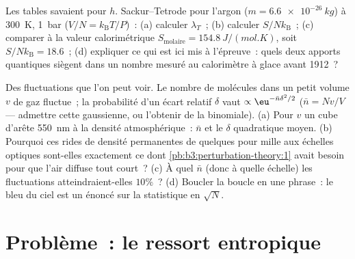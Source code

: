 \begin{exercise}[$\star\star\star$]\label{exo:b3:microcanonical-ensemble:11}
Les tables savaient pour $h$. Sackur--Tetrode pour l'argon ($m =
\qty{6.6e-26}{kg}$) à \qty{300}{K}, \qty{1}{bar} ($V/N =
k_{\text{B}}T/P$)~: (a) calculer $\lambda_T$~; (b) calculer $S/N
k_{\text{B}}$~; (c) comparer à la valeur calorimétrique
$S_{\text{molaire}} = \qty{154.8}{J/(mol.K)}$, soit $S/Nk_{\text{B}}
= 18.6$~; (d) expliquer ce qui est ici mis à l'épreuve~: quels deux
apports quantiques siègent dans un nombre mesuré au calorimètre à
glace avant 1912~?
\end{exercise}

\begin{exercise}[$\star\star\star$]\label{exo:b3:microcanonical-ensemble:12}
Des fluctuations que l'on peut voir. Le nombre de molécules dans un
petit volume $v$ de gaz fluctue~; la probabilité d'un écart relatif
$\delta$ vaut $\propto\eu^{-\bar n\delta^2/2}$ ($\bar n = Nv/V$ ---
admettre cette gaussienne, ou l'obtenir de la binomiale). (a) Pour
$v$ un cube d'arête \qty{550}{nm} à la densité atmosphérique~:
$\bar n$ et le $\delta$ quadratique moyen. (b) Pourquoi ces rides de
densité permanentes de quelques pour mille aux échelles optiques
sont-elles exactement ce dont
\cref{pb:b3:perturbation-theory:1} avait besoin pour que l'air diffuse
tout court~? (c) À quel $\bar n$ (donc à quelle échelle) les
fluctuations atteindraient-elles $10\%$~? (d) Boucler la boucle en une
phrase~: le bleu du ciel est un énoncé sur la statistique en $\sqrt N$.
\end{exercise}

\section{Problème~: le ressort entropique}

